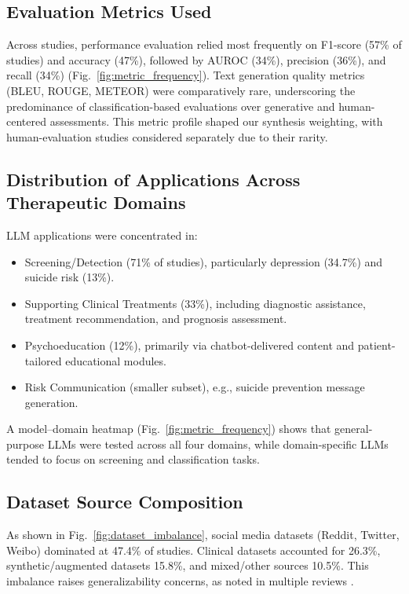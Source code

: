 \documentclass[journal]{IEEEtran}
\begin{document}
\subsection{Evaluation Metrics Used}
Across studies, performance evaluation relied most frequently on F1-score (57\% of studies) and accuracy (47\%), followed by AUROC (34\%), precision (36\%), and recall (34\%) (Fig.~\ref{fig:metric_frequency}).  
Text generation quality metrics (BLEU, ROUGE, METEOR) were comparatively rare, underscoring the predominance of classification-based evaluations over generative and human-centered assessments.  
This metric profile shaped our synthesis weighting, with human-evaluation studies considered separately due to their rarity.

\subsection{Distribution of Applications Across Therapeutic Domains}
LLM applications were concentrated in:
\begin{itemize}
    \item Screening/Detection (71\% of studies), particularly depression (34.7\%) and suicide risk (13\%).
    \item Supporting Clinical Treatments (33\%), including diagnostic assistance, treatment recommendation, and prognosis assessment.
    \item Psychoeducation (12\%), primarily via chatbot-delivered content and patient-tailored educational modules.
    \item Risk Communication (smaller subset), e.g., suicide prevention message generation.
\end{itemize}

A model--domain heatmap (Fig.~\ref{fig:metric_frequency}) shows that general-purpose LLMs were tested across all four domains, while domain-specific LLMs tended to focus on screening and classification tasks.

\subsection{Dataset Source Composition}
As shown in Fig.~\ref{fig:dataset_imbalance}, social media datasets (Reddit, Twitter, Weibo) dominated at 47.4\% of studies. Clinical datasets accounted for 26.3\%, synthetic/augmented datasets 15.8\%, and mixed/other sources 10.5\%.  
This imbalance raises generalizability concerns, as noted in multiple reviews \citep{Hua2024b, Ibrahimov2024}.
\end{document}
